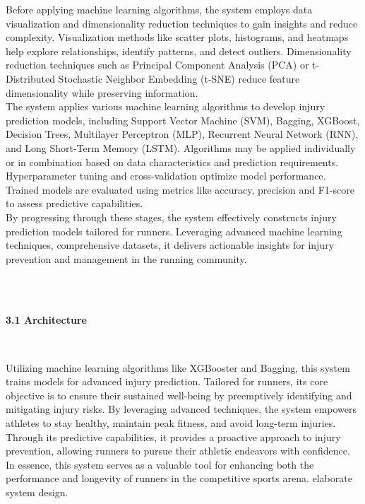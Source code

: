 \documentclass[12pt, English]{article}
\newcommand\tab[1][1cm]{\hspace*{#1}}
\begin{document}
\begin{normalsize}
\begin{normalsize}
\tab Before applying machine learning algorithms, the system employs data visualization and dimensionality reduction techniques to gain insights and reduce complexity. Visualization methods like scatter plots, histograms, and heatmaps help explore relationships, identify patterns, and detect outliers. Dimensionality reduction techniques such as Principal Component Analysis (PCA) or t-Distributed Stochastic Neighbor Embedding (t-SNE) reduce feature dimensionality while preserving information.\\

\tab The system applies various machine learning algorithms to develop injury prediction models, including Support Vector Machine (SVM), Bagging, XGBoost, Decision Trees, Multilayer Perceptron (MLP), Recurrent Neural Network (RNN), and Long Short-Term Memory (LSTM). Algorithms may be applied individually or in combination based on data characteristics and prediction requirements. Hyperparameter tuning and cross-validation optimize model performance. Trained models are evaluated using metrics like accuracy, precision and F1-score to assess predictive capabilities.\\

\tab By progressing through these stages, the system effectively constructs injury prediction models tailored for runners. Leveraging advanced machine learning techniques, comprehensive datasets, it delivers actionable insights for injury prevention and management in the running community.
\end{normalsize}
\\\\
\begin{large}
\textbf{3.1 Architecture}
\end{large}
\\
\begin{normalsize}
\tab Utilizing machine learning algorithms like XGBooster and Bagging, this system trains models for advanced injury prediction. Tailored for runners, its core objective is to ensure their sustained well-being by preemptively identifying and mitigating injury risks. By leveraging advanced techniques, the system empowers athletes to stay healthy, maintain peak fitness, and avoid long-term injuries. Through its predictive capabilities, it provides a proactive approach to injury prevention, allowing runners to pursue their athletic endeavors with confidence. In essence, this system serves as a valuable tool for enhancing both the performance and longevity of runners in the competitive sports arena. elaborate system design.\\


\end{normalsize}
\end{normalsize}
\end{document}
